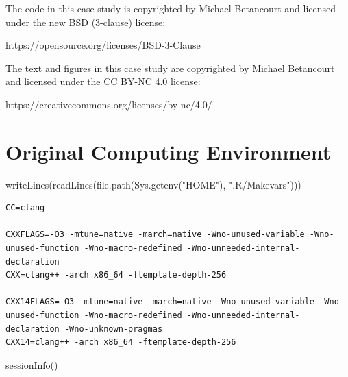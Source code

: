 \documentclass[
  letterpaper,
  DIV=11,
  numbers=noendperiod]{scrartcl}
\newenvironment{Shaded}{\begin{snugshade}}{\end{snugshade}}
\newcommand{\FunctionTok}[1]{\textcolor[rgb]{0.28,0.35,0.67}{#1}}
\newcommand{\NormalTok}[1]{\textcolor[rgb]{0.00,0.23,0.31}{#1}}
\newcommand{\StringTok}[1]{\textcolor[rgb]{0.13,0.47,0.30}{#1}}
\begin{document}
The code in this case study is copyrighted by Michael Betancourt and
licensed under the new BSD (3-clause) license:

https://opensource.org/licenses/BSD-3-Clause

The text and figures in this case study are copyrighted by Michael
Betancourt and licensed under the CC BY-NC 4.0 license:

https://creativecommons.org/licenses/by-nc/4.0/

\hypertarget{original-computing-environment}{%
\section*{Original Computing
Environment}\label{original-computing-environment}}

\begin{Shaded}
\begin{Highlighting}[]
\FunctionTok{writeLines}\NormalTok{(}\FunctionTok{readLines}\NormalTok{(}\FunctionTok{file.path}\NormalTok{(}\FunctionTok{Sys.getenv}\NormalTok{(}\StringTok{"HOME"}\NormalTok{), }\StringTok{".R/Makevars"}\NormalTok{)))}
\end{Highlighting}
\end{Shaded}

\begin{verbatim}
CC=clang

CXXFLAGS=-O3 -mtune=native -march=native -Wno-unused-variable -Wno-unused-function -Wno-macro-redefined -Wno-unneeded-internal-declaration
CXX=clang++ -arch x86_64 -ftemplate-depth-256

CXX14FLAGS=-O3 -mtune=native -march=native -Wno-unused-variable -Wno-unused-function -Wno-macro-redefined -Wno-unneeded-internal-declaration -Wno-unknown-pragmas
CXX14=clang++ -arch x86_64 -ftemplate-depth-256
\end{verbatim}

\begin{Shaded}
\begin{Highlighting}[]
\FunctionTok{sessionInfo}\NormalTok{()}
\end{Highlighting}
\end{Shaded}
\end{document}
